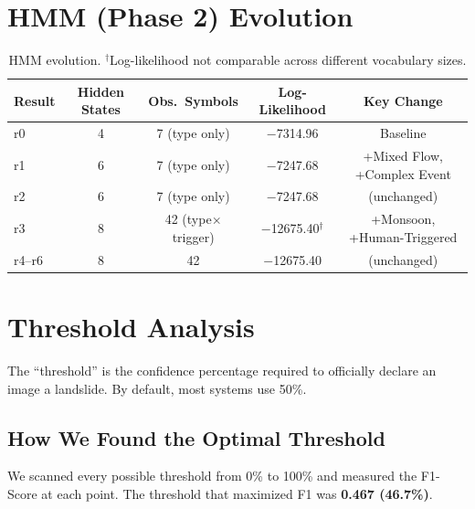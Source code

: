 \documentclass[11pt]{article}
\begin{document}

\section{HMM (Phase 2) Evolution}

\begin{table}[H]
\centering
\begin{tabular}{@{}lcccc@{}}
\toprule
\textbf{Result} & \textbf{Hidden States} & \textbf{Obs.\ Symbols} & \textbf{Log-Likelihood} & \textbf{Key Change} \\
\midrule
r0 & 4 & 7 (type only)   & $-$7314.96  & Baseline \\
r1 & 6 & 7 (type only)   & $-$7247.68  & +Mixed Flow, +Complex Event \\
r2 & 6 & 7 (type only)   & $-$7247.68  & (unchanged) \\
r3 & 8 & 42 (type$\times$trigger) & $-$12675.40$^\dagger$ & +Monsoon, +Human-Triggered \\
r4--r6 & 8 & 42          & $-$12675.40 & (unchanged) \\
\bottomrule
\end{tabular}
\caption{HMM evolution. $^\dagger$Log-likelihood not comparable across different vocabulary sizes.}
\end{table}

\section{Threshold Analysis}

The ``threshold'' is the confidence percentage required to officially declare an image a landslide. By default, most systems use 50\%.

\subsection{How We Found the Optimal Threshold}
We scanned every possible threshold from 0\% to 100\% and measured the F1-Score at each point. The threshold that maximized F1 was \textbf{0.467 (46.7\%)}.
\end{document}
